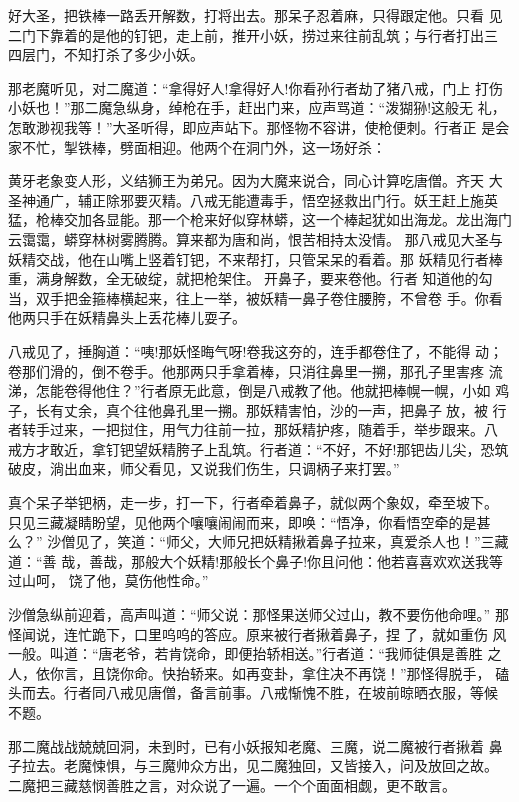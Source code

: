 好大圣，把铁棒一路丢开解数，打将出去。那呆子忍着麻，只得跟定他。只看
见二门下靠着的是他的钉钯，走上前，推开小妖，捞过来往前乱筑；与行者打出三
四层门，不知打杀了多少小妖。

那老魔听见，对二魔道：“拿得好人!拿得好人!你看孙行者劫了猪八戒，门上
打伤小妖也！”那二魔急纵身，绰枪在手，赶出门来，应声骂道：“泼猢狲!这般无
礼，怎敢渺视我等！”大圣听得，即应声站下。那怪物不容讲，使枪便刺。行者正
是会家不忙，掣铁棒，劈面相迎。他两个在洞门外，这一场好杀：

黄牙老象变人形，义结狮王为弟兄。因为大魔来说合，同心计算吃唐僧。齐天
大圣神通广，辅正除邪要灭精。八戒无能遭毒手，悟空拯救出门行。妖王赶上施英
猛，枪棒交加各显能。那一个枪来好似穿林蟒，这一个棒起犹如出海龙。龙出海门
云霭霭，蟒穿林树雾腾腾。算来都为唐和尚，恨苦相持太没情。
那八戒见大圣与妖精交战，他在山嘴上竖着钉钯，不来帮打，只管呆呆的看着。那
妖精见行者棒重，满身解数，全无破绽，就把枪架住。开鼻子，要来卷他。行者
知道他的勾当，双手把金箍棒横起来，往上一举，被妖精一鼻子卷住腰胯，不曾卷
手。你看他两只手在妖精鼻头上丢花棒儿耍子。

八戒见了，捶胸道：“咦!那妖怪晦气呀!卷我这夯的，连手都卷住了，不能得
动；卷那们滑的，倒不卷手。他那两只手拿着棒，只消往鼻里一搠，那孔子里害疼
流涕，怎能卷得他住？”行者原无此意，倒是八戒教了他。他就把棒幌一幌，小如
鸡子，长有丈余，真个往他鼻孔里一搠。那妖精害怕，沙的一声，把鼻子放，被
行者转手过来，一把挝住，用气力往前一拉，那妖精护疼，随着手，举步跟来。八
戒方才敢近，拿钉钯望妖精胯子上乱筑。行者道：“不好，不好!那钯齿儿尖，恐筑
破皮，淌出血来，师父看见，又说我们伤生，只调柄子来打罢。”

真个呆子举钯柄，走一步，打一下，行者牵着鼻子，就似两个象奴，牵至坡下。
只见三藏凝睛盼望，见他两个嚷嚷闹闹而来，即唤：“悟净，你看悟空牵的是甚么？”
沙僧见了，笑道：“师父，大师兄把妖精揪着鼻子拉来，真爱杀人也！”三藏道：“善
哉，善哉，那般大个妖精!那般长个鼻子!你且问他：他若喜喜欢欢送我等过山呵，
饶了他，莫伤他性命。”

沙僧急纵前迎着，高声叫道：“师父说：那怪果送师父过山，教不要伤他命哩。”
那怪闻说，连忙跪下，口里呜呜的答应。原来被行者揪着鼻子，捏了，就如重伤
风一般。叫道：“唐老爷，若肯饶命，即便抬轿相送。”行者道：“我师徒俱是善胜
之人，依你言，且饶你命。快抬轿来。如再变卦，拿住决不再饶！”那怪得脱手，
磕头而去。行者同八戒见唐僧，备言前事。八戒惭愧不胜，在坡前晾晒衣服，等候
不题。

那二魔战战兢兢回洞，未到时，已有小妖报知老魔、三魔，说二魔被行者揪着
鼻子拉去。老魔悚惧，与三魔帅众方出，见二魔独回，又皆接入，问及放回之故。
二魔把三藏慈悯善胜之言，对众说了一遍。一个个面面相觑，更不敢言。

